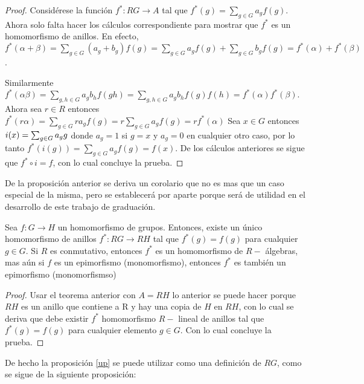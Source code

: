 \begin{proof}
Considérese la función $f^* \colon RG \to A$ tal que $f^*(g)=\sum_{g\in G}a_gf(g)$. Ahora solo falta hacer los cálculos correspondiente para mostrar que $f^*$ es un homomorfismo de anillos. En efecto, $f^*(\alpha + \beta ) = \sum_{g \in G}(a_g + b_g)f(g) = \sum_{g \in G}a_gf(g) + \sum_{g \in G}b_gf(g) = f^*(\alpha) + f^*(\beta) $. 

Similarmente $f^*(\alpha\beta)=\sum_{g,h\in G}a_gb_hf(gh)= \sum_{g,h\in G}a_gb_hf(g)f(h) = f^*(\alpha)f^*(\beta)$. Ahora sea $r \in R$ entonces $f^*(r\alpha)=\sum_{g\in G}ra_gf(g)=r\sum_{g\in G}a_gf(g)=rf^*(\alpha)$
Sea $x \in G$ entonces $i(x) = \sum_{g \in G} a_{g} g$ donde $a_g = 1$ si $g = x$ y $a_g= 0$ en cualquier otro caso, por lo tanto $f^*(i(g))= \sum_{g \in G} a_gf(g)=f(x)$. De los cálculos anteriores se sigue que $f^*\circ i = f$, con lo cual concluye la prueba. 
\qedhere
\end{proof}



De la proposición anterior se deriva un corolario que no es mas que un caso especial de la misma,  pero se establecerá por aparte porque será de utilidad en el desarrollo de este trabajo de graduación.

\begin{corolario}\label{aumento}
Sea $f \colon G \to H$ un homomorfismo de grupos. Entonces, existe un único homomorfismo de anillos $f^* \colon RG \to RH$ tal que $f^*(g) = f(g)$ para cualquier $g \in G$. Si $R$ es conmutativo, entonces $f^*$ es un homomorfismo de $R-$ álgebras, mas aún si $f$ es un epimorfismo (monomorfismo), entonces $f^*$ es también un epimorfismo (monomorfismso)
\end{corolario}

\begin{proof}
Usar el teorema anterior con $A=RH$ lo anterior se puede hacer porque $RH$ es un anillo que contiene a R y hay una copia de $H$ en $RH$, con lo cual se deriva que debe existir $f^*$ homomorfismo $R-$ lineal de anillos tal que $f^*(g)=f(g)$ para cualquier elemento $g \in G$. Con lo cual concluye la prueba.
\qedhere
\end{proof}




De hecho la proposición \ref{up} se puede utilizar como una definición de $RG$, como se sigue de la siguiente proposición:

